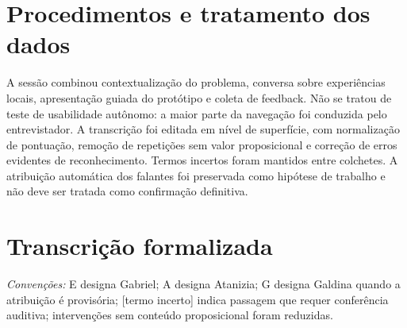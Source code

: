 \documentclass[12pt,a4paper]{article}
\begin{document}
\section{Procedimentos e tratamento dos dados}
A sessão combinou contextualização do problema, conversa sobre experiências locais, apresentação guiada do protótipo e coleta de feedback. Não se tratou de teste de usabilidade autônomo: a maior parte da navegação foi conduzida pelo entrevistador. A transcrição foi editada em nível de superfície, com normalização de pontuação, remoção de repetições sem valor proposicional e correção de erros evidentes de reconhecimento. Termos incertos foram mantidos entre colchetes. A atribuição automática dos falantes foi preservada como hipótese de trabalho e não deve ser tratada como confirmação definitiva.
\section{Transcrição formalizada}
\noindent\textit{Convenções:} E designa Gabriel; A designa Atanizia; G designa Galdina quando a atribuição é provisória; [termo incerto] indica passagem que requer conferência auditiva; intervenções sem conteúdo proposicional foram reduzidas.
\end{document}
